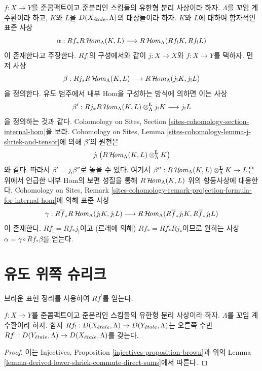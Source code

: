 \begin{remark}
\label{remark-projection-formula-for-internal-hom}
$f : X \to Y$를 준콤팩트이고 준분리인 스킴들의 유한형 분리 사상이라
하자. $\Lambda$를 꼬임 계수환이라 하고, $K$와 $L$을
$D(X_{\acute{e}tale}, \Lambda)$의 대상들이라 하자.
$K$와 $L$에 대하여 함자적인 표준 사상
$$
\alpha :
Rf_*R\mathop{\mathcal{H}\!\mathit{om}}\nolimits_\Lambda(K, L)
\longrightarrow
R\mathop{\mathcal{H}\!\mathit{om}}\nolimits_\Lambda(Rf_!K, Rf_!L)
$$
이 존재한다고 주장한다. $Rf_!$의 구성에서와 같이
$j : X \to \overline{X}$와
$\overline{f} : \overline{X} \to Y$를 택하자.
먼저 사상
$$
\beta :
Rj_*R\mathop{\mathcal{H}\!\mathit{om}}\nolimits_\Lambda(K, L)
\longrightarrow
R\mathop{\mathcal{H}\!\mathit{om}}\nolimits_\Lambda(j_!K, j_!L)
$$
을 정의한다. 유도 범주에서 내부 Hom을 구성하는 방식에 의하면 이는
사상
$$
\beta' :
Rj_*R\mathop{\mathcal{H}\!\mathit{om}}\nolimits_\Lambda(K, L) \otimes_\Lambda^\mathbf{L} j_!K
\longrightarrow
j_!L
$$
을 정의하는 것과 같다. Cohomology on Sites, Section
\ref{sites-cohomology-section-internal-hom}을 보라.
Cohomology on Sites, Lemma
\ref{sites-cohomology-lemma-j-shriek-and-tensor}에 의해
$\beta'$의 원천은
$$
j_!\left(R\mathop{\mathcal{H}\!\mathit{om}}\nolimits_\Lambda(K, L) \otimes_\Lambda^\mathbf{L} K\right)
$$
와 같다. 따라서 $\beta' = j_!\beta''$로 놓을 수 있다.
여기서
$\beta'' : R\mathop{\mathcal{H}\!\mathit{om}}\nolimits_\Lambda(K, L) \otimes_\Lambda^\mathbf{L} K \to L$은
위에서 언급한 내부 Hom의 보편 성질을 통해
$R\mathop{\mathcal{H}\!\mathit{om}}\nolimits_\Lambda(K, L)$ 위의 항등사상에 대응한다.
Cohomology on Sites, Remark
\ref{sites-cohomology-remark-projection-formula-for-internal-hom}에 의해
표준 사상
$$
\gamma :
R\overline{f}_*R\mathop{\mathcal{H}\!\mathit{om}}\nolimits_\Lambda(j_!K, j_!L)
\longrightarrow
R\mathop{\mathcal{H}\!\mathit{om}}\nolimits_\Lambda(R\overline{f}_*j_!K, R\overline{f}_*j_!L)
$$
이 존재한다. $Rf_! = R\overline{f}_*j_!$이고 (르레에 의해)
$Rf_* = R\overline{f}_* Rj_*$이므로 원하는 사상
$\alpha = \gamma \circ R\overline{f}_*\beta$를 얻는다.
\end{remark}


\section{유도 위쪽 슈리크}
\label{section-derived-upper-shriek}

\noindent
브라운 표현 정리를 사용하여 $Rf^!$를 얻는다.

\begin{lemma}
\label{lemma-upper-shriek-derived}
$f : X \to Y$를 준콤팩트이고 준분리인 스킴들의 유한형 분리 사상이라
하자. $\Lambda$를 꼬임 계수환이라 하자. 함자
$Rf_! : D(X_{\acute{e}tale}, \Lambda) \to D(Y_{\acute{e}tale}, \Lambda)$는 오른쪽 수반
$Rf^! : D(Y_{\acute{e}tale}, \Lambda) \to D(X_{\acute{e}tale}, \Lambda)$를 갖는다.
\end{lemma}

\begin{proof}
이는 Injectives, Proposition \ref{injectives-proposition-brown}과
위의 Lemma \ref{lemma-derived-lower-shriek-commute-direct-sums}에서
따른다.
\end{proof}

